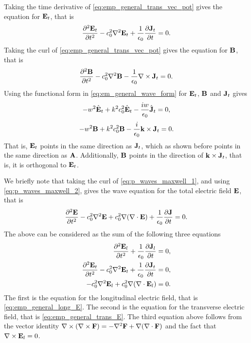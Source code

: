 \documentclass[a4paper,11pt]{report}
\begin{document}
Taking the time derivative of \cref{eq:emp_general_trans_vec_pot} gives the equation for $\mathbf{E}_t$, that is
\begin{equation}
    \label{eq:emp_general_trans_E}
    \frac{\partial^2 \mathbf{E}_t}{\partial t^2} - c_0^2 \nabla^2 \mathbf{E}_t + \frac{1}{\epsilon_0} \frac{\partial \mathbf{J}_t}{\partial t} = 0.
\end{equation}
Taking the curl of \cref{eq:emp_general_trans_vec_pot} gives the equation for $\mathbf{B}$, that is
\begin{equation}
    \label{eq:emp_general_trans_B}
    \frac{\partial^2 \mathbf{B}}{\partial t^2} - c_0^2 \nabla^2 \mathbf{B} - \frac{1}{\epsilon_0} \nabla \times \mathbf{J}_t = 0.
\end{equation}
Using the functional form in \cref{eq:em_general_wave_form} for $\mathbf{E}_t$, $\mathbf{B}$ and $\mathbf{J}_t$ gives
\begin{equation}
    -w^2 \hat{\mathbf{E}}_t + k^2 c_0^2 \hat{\mathbf{E}}_t - \frac{iw}{\epsilon_0} \hat{\mathbf{J}}_t = 0,
\end{equation}
\begin{equation}
    -w^2 \mathbf{B} + k^2 c_0^2 \mathbf{B} - \frac{i}{\epsilon_0} \mathbf{k} \times \mathbf{J}_t = 0.
\end{equation}
That is, $\mathbf{E}_t$ points in the same direction as $\mathbf{J}_t$, which as shown before points in the same direction as $\mathbf{A}$. Additionally, $\mathbf{B}$ points in the direction of $\mathbf{k} \times \mathbf{J}_t$, that is, it is orthogonal to $\mathbf{E}_t$.

We briefly note that taking the curl of \cref{eq:p_waves_maxwell_1}, and using \cref{eq:p_waves_maxwell_2}, gives the wave equation for the total electric field $\mathbf{E}$, that is 
\begin{equation}
    \frac{\partial^2 \mathbf{E}}{\partial t^2} - c_0^2 \nabla^2 \mathbf{E} + c_0^2 \nabla (\nabla \cdot \mathbf{E}) + \frac{1}{\epsilon_0} \frac{\partial \mathbf{J}}{\partial t} = 0.
\end{equation}
The above can be considered as the sum of the following three equations
\begin{align*}
    \frac{\partial^2 \mathbf{E}_l}{\partial t^2} + \frac{1}{\epsilon_0} \frac{\partial \mathbf{J}_l}{\partial t} &= 0, \\
    \frac{\partial^2 \mathbf{E}_t}{\partial t^2} - c_0^2 \nabla^2 \mathbf{E}_t + \frac{1}{\epsilon_0} \frac{\partial \mathbf{J}_t}{\partial t} &= 0, \\
    -c_0^2 \nabla^2 \mathbf{E}_l + c_0^2 \nabla (\nabla \cdot \mathbf{E}_l) &= 0.
\end{align*}
The first is the equation for the longitudinal electric field, that is \cref{eq:emp_general_long_E}. The second is the equation for the transverse electric field, that is \cref{eq:emp_general_trans_E}. The third equation above follows from the vector identity $\nabla \times (\nabla \times \mathbf{F}) = -\nabla^2 \mathbf{F} + \nabla ( \nabla \cdot \mathbf{F} )$ and the fact that $\nabla \times \mathbf{E}_l = 0$.
\end{document}
